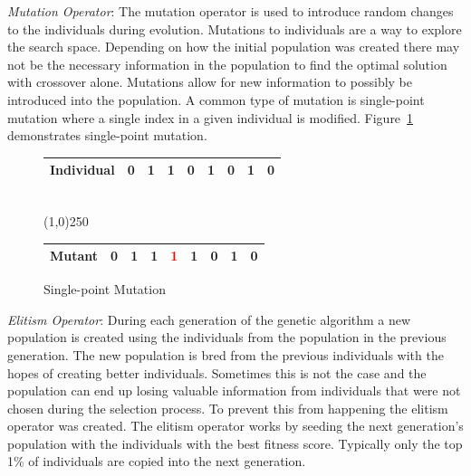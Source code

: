 \textit{Mutation Operator}: The mutation operator is used to introduce random changes to the individuals during evolution. Mutations to individuals are a way to explore the search space. Depending on how the initial population was created there may not be the necessary information in the population to find the optimal solution with crossover alone. Mutations allow for new information to possibly be introduced into the population. A common type of mutation is single-point mutation where a single index in a given individual is modified. Figure~\ref{fig:mutation} demonstrates single-point mutation.

\begin{figure}[H]
  \centering
  \begin{tabular}{ | p{2cm} | l | l | l | l | l | l | l | l | }
    \hline
    Individual & 0 & 1 & 1 & 0 & 1 & 0 & 1 & 0 \\
    \hline
  \end{tabular}
  \\
  \vspace{3 mm}
  \line(1,0){250}
  \\
  \vspace{3 mm}
  \begin{tabular}{ | p{2cm} | l | l | l | l | l | l | l | l | }
    \hline
    Mutant & 0 & 1 & 1 & \textcolor{red}{1} & 1 & 0 & 1 & 0 \\
    \hline
  \end{tabular}
  \caption{Single-point Mutation}
  \label{fig:mutation}
\end{figure}

\textit{Elitism Operator}: During each generation of the genetic algorithm a new population is created using the individuals from the population in the previous generation. The new population is bred from the previous individuals with the hopes of creating better individuals. Sometimes this is not the case and the population can end up losing valuable information from individuals that were not chosen during the selection process. To prevent this from happening the elitism operator was created. The elitism operator works by seeding the next generation's population with the individuals with the best fitness score. Typically only the top 1\% of individuals are copied into the next generation.